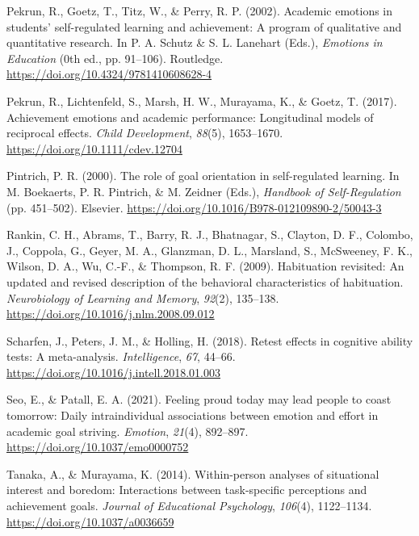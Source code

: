 \documentclass[
  man,
  floatsintext,
  longtable,
  nolmodern,
  notxfonts,
  notimes,
  colorlinks=true,linkcolor=blue,citecolor=blue,urlcolor=blue]{apa7}
\newlength{\cslhangindent}
\newenvironment{CSLReferences}[2] %
 {\begin{list}{}{%
  \setlength{\itemindent}{0pt}
  \setlength{\leftmargin}{0pt}
  \setlength{\parsep}{0pt}
  \ifodd #1
   \setlength{\leftmargin}{\cslhangindent}
   \setlength{\itemindent}{-1\cslhangindent}
  \fi
  \setlength{\itemsep}{#2\baselineskip}}}
 {\end{list}}
\begin{document}
\begin{CSLReferences}{1}{0}
Pekrun, R., Goetz, T., Titz, W., \& Perry, R. P. (2002). Academic
emotions in students' self-regulated learning and achievement: A program
of qualitative and quantitative research. In P. A. Schutz \& S. L.
Lanehart (Eds.), \emph{Emotions in {Education}} (0th ed., pp. 91--106).
Routledge. \url{https://doi.org/10.4324/9781410608628-4}

Pekrun, R., Lichtenfeld, S., Marsh, H. W., Murayama, K., \& Goetz, T.
(2017). Achievement emotions and academic performance: Longitudinal
models of reciprocal effects. \emph{Child Development}, \emph{88}(5),
1653--1670. \url{https://doi.org/10.1111/cdev.12704}

Pintrich, P. R. (2000). The role of goal orientation in self-regulated
learning. In M. Boekaerts, P. R. Pintrich, \& M. Zeidner (Eds.),
\emph{Handbook of {Self-Regulation}} (pp. 451--502). Elsevier.
\url{https://doi.org/10.1016/B978-012109890-2/50043-3}

Rankin, C. H., Abrams, T., Barry, R. J., Bhatnagar, S., Clayton, D. F.,
Colombo, J., Coppola, G., Geyer, M. A., Glanzman, D. L., Marsland, S.,
McSweeney, F. K., Wilson, D. A., Wu, C.-F., \& Thompson, R. F. (2009).
Habituation revisited: {An} updated and revised description of the
behavioral characteristics of habituation. \emph{Neurobiology of
Learning and Memory}, \emph{92}(2), 135--138.
\url{https://doi.org/10.1016/j.nlm.2008.09.012}

Scharfen, J., Peters, J. M., \& Holling, H. (2018). Retest effects in
cognitive ability tests: {A} meta-analysis. \emph{Intelligence},
\emph{67}, 44--66. \url{https://doi.org/10.1016/j.intell.2018.01.003}

Seo, E., \& Patall, E. A. (2021). Feeling proud today may lead people to
coast tomorrow: {Daily} intraindividual associations between emotion and
effort in academic goal striving. \emph{Emotion}, \emph{21}(4),
892--897. \url{https://doi.org/10.1037/emo0000752}

Tanaka, A., \& Murayama, K. (2014). Within-person analyses of
situational interest and boredom: {Interactions} between task-specific
perceptions and achievement goals. \emph{Journal of Educational
Psychology}, \emph{106}(4), 1122--1134.
\url{https://doi.org/10.1037/a0036659}


\end{CSLReferences}
\end{document}
